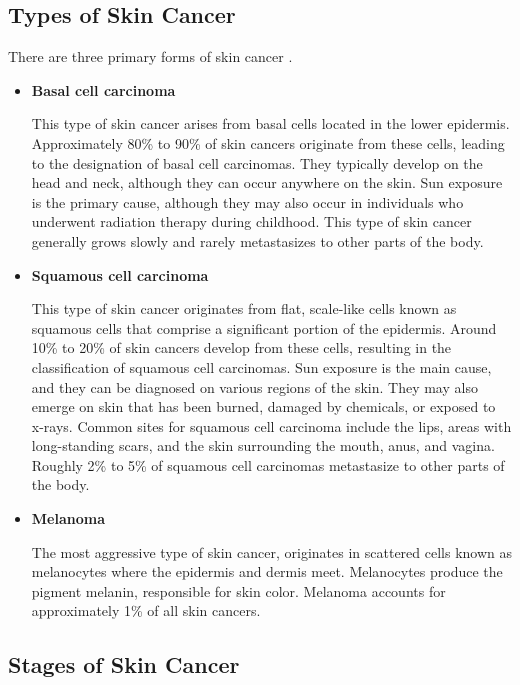 \subsection{Types of Skin Cancer}

There are three primary forms of skin cancer \cite{BaseCancerKnowledge}. \\

\begin{itemize}
\item \textbf{Basal cell carcinoma}

This type of skin cancer arises from basal cells located in the lower epidermis. Approximately 80\% to 90\% of skin cancers originate from these cells, leading to the designation of basal cell carcinomas. They typically develop on the head and neck, although they can occur anywhere on the skin. Sun exposure is the primary cause, although they may also occur in individuals who underwent radiation therapy during childhood. This type of skin cancer generally grows slowly and rarely metastasizes to other parts of the body. \\

\item \textbf{Squamous cell carcinoma}

This type of skin cancer originates from flat, scale-like cells known as squamous cells that comprise a significant portion of the epidermis. Around 10\% to 20\% of skin cancers develop from these cells, resulting in the classification of squamous cell carcinomas. Sun exposure is the main cause, and they can be diagnosed on various regions of the skin. They may also emerge on skin that has been burned, damaged by chemicals, or exposed to x-rays. Common sites for squamous cell carcinoma include the lips, areas with long-standing scars, and the skin surrounding the mouth, anus, and vagina. Roughly 2\% to 5\% of squamous cell carcinomas metastasize to other parts of the body. \\

\item \textbf{Melanoma}

The most aggressive type of skin cancer, originates in scattered cells known as melanocytes where the epidermis and dermis meet. Melanocytes produce the pigment melanin, responsible for skin color. Melanoma accounts for approximately 1\% of all skin cancers.

\end{itemize}
\newpage

\subsection{Stages of Skin Cancer}

